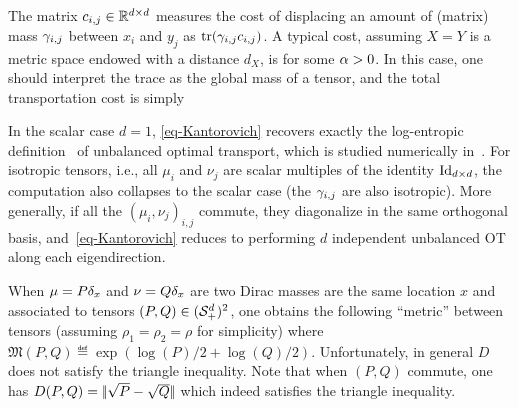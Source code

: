 The matrix $c_{i,j} \in \mathbb{R}^{d \times d}$ measures the cost of displacing an amount of (matrix) mass $\gamma_{i,j}$ between $x_i$ and $y_j$  as $\operatorname{tr}(\gamma_{i,j}c_{i,j})$. %
%
A typical cost, assuming $X=Y$ is a metric space endowed with a distance $d_X$, is
for some $\alpha>0$.  In this case, one should interpret the trace as the global mass of a tensor, and the total transportation cost is simply 


\begin{rem}[Classical OT]
	In the scalar case $d=1$, \eqref{eq-Kantorovich} recovers exactly the log-entropic definition~\cite{LieroMielkeSavareLong} of unbalanced optimal transport, which is studied numerically in~\cite{2016-chizat-sinkhorn}. %
	For isotropic tensors, i.e., all $\mu_i$ and $\nu_j$ are scalar multiples of the identity $\mathrm{Id}_{d \times d}$, the computation also collapses to the scalar case (the $\gamma_{i,j}$ are also isotropic). More generally, if all the $(\mu_i,\nu_j)_{i,j}$ commute, they diagonalize in the same orthogonal basis, and~\eqref{eq-Kantorovich} reduces to performing $d$ independent unbalanced OT along each eigendirection. 
\end{rem}

\begin{rem}
	When $\mu=P \delta_{x}$ and $\nu=Q \delta_{x}$ are two Dirac masses are the same location $x$ and associated to tensors $(P,Q) \in (\mathcal{S}_+^d)^2$,
	one obtains the following ``metric'' between tensors (assuming $\rho_1=\rho_2=\rho$ for simplicity)
	where $\mathfrak{M}(P,Q) \eqdef \exp(\log(P)/2+\log(Q)/2)$.
	Unfortunately, in general $D$ does not satisfy the triangle inequality.
	Note that when $(P,Q)$ commute, one has $D(P,Q) = |\!| \sqrt{P}-\sqrt{Q} |\!|$ which indeed satisfies the triangle inequality. 
	
%	
\end{rem}

